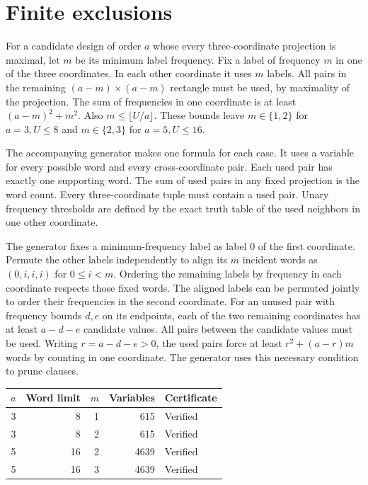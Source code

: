 \documentclass[11pt]{article}
\begin{document}
\section{Finite exclusions}

For a candidate design of order \(a\) whose every three-coordinate
projection is maximal, let \(m\) be its minimum label frequency.
Fix a label of frequency \(m\) in one of the three coordinates.
In each other coordinate it uses \(m\) labels. All pairs in the
remaining \((a-m)\times(a-m)\) rectangle must be used, by maximality
of the projection. The sum of frequencies in one coordinate
is at least \((a-m)^2+m^2\). Also \(m\le\lfloor U/a\rfloor\).
These bounds leave \(m\in\{1,2\}\) for \(a=3,U\le8\) and
\(m\in\{2,3\}\) for \(a=5,U\le16\).

The accompanying generator makes one formula for each case.
It uses a variable for every possible word and every
cross-coordinate pair. Each used pair has exactly one supporting
word. The sum of used pairs in any fixed projection is the word
count. Every three-coordinate tuple must contain a used pair.
Unary frequency thresholds are defined by the exact truth table of
the used neighbors in one other coordinate.

The generator fixes a minimum-frequency label as label 0 of the
first coordinate. Permute the other labels independently to align
its \(m\) incident words as \((0,i,i,i)\) for \(0\le i<m\).
Ordering the remaining labels by frequency in each coordinate
respects those fixed words. The aligned labels can be permuted
jointly to order their frequencies in the second coordinate.
For an unused pair with frequency bounds \(d,e\) on its endpoints,
each of the two remaining coordinates has at least \(a-d-e\)
candidate values. All pairs between the candidate values must be
used. Writing \(r=a-d-e>0\), the used pairs force at least
\(r^2+(a-r)m\) words by counting in one coordinate. The generator
uses this necessary condition to prune clauses.

\begin{center}
\begin{tabular}{rrrrl}
\(a\) & Word limit & \(m\) & Variables & Certificate\\
\hline
3 & 8 & 1 & 615 & Verified\\
3 & 8 & 2 & 615 & Verified\\
5 & 16 & 2 & 4639 & Verified\\
5 & 16 & 3 & 4639 & Verified
\end{tabular}
\end{center}
\end{document}
